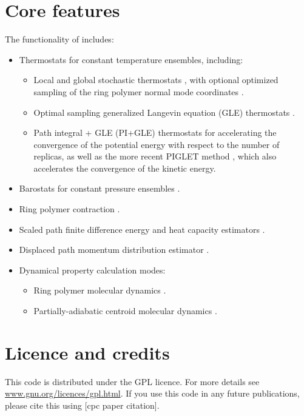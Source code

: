 \documentclass[11pt,english,fleqn]{report}
\begin{document}
\section{Core features}

The functionality of \ipi includes:
\begin{itemize}
\item Thermostats for constant temperature ensembles, including: \begin{itemize}
\item Local and global stochastic thermostats \cite{plangevin1908cras,buss-parr08cpc}, with optional optimized sampling of the ring polymer normal mode coordinates \cite{ceri+10jcp}.
\item Optimal sampling generalized Langevin equation (GLE) thermostats \cite{ceri+09jctc}.
\item Path integral + GLE (PI+GLE) thermostats \cite{ceri+11jcp} for accelerating the
convergence of the potential energy with respect to the number of replicas, 
as well as the more recent PIGLET method \cite{ceri-mano12prl}, which also
accelerates the convergence of the kinetic energy.
\end{itemize}
\item Barostats for constant pressure ensembles \cite{mart+99jcp,buss+09jpc}.
\item Ring polymer contraction \cite{mark-mano08jcp}.
\item Scaled path finite difference energy and heat capacity estimators
\cite{tyamamoto05jcp}.
\item Displaced path momentum distribution estimator \cite{linlin+10prl}.
\item Dynamical property calculation modes:\begin{itemize}
\item Ring polymer molecular dynamics \cite{crai-mano04jcp}.
\item Partially-adiabatic centroid molecular dynamics \cite{habe+08jcp,hone+06jcp}.
\end{itemize}
\end{itemize}

\section{Licence and credits}

This code is distributed under the GPL licence. For more details see
\url{www.gnu.org/licences/gpl.html}. If you use this code in any
future publications, please cite this using {[}cpc paper citation{]}.
\end{document}

